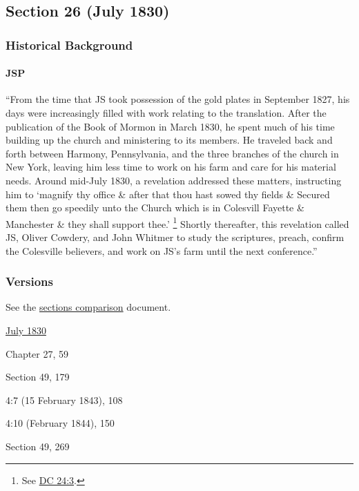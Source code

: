 \subsection{Section 26 (July 1830)}
	\label{DC26}
	
	\subsubsection{Historical Background}
		\label{DC26-HB}
		
		\paragraph{JSP}
		
			``From the time that JS took possession of the gold plates in September 1827, his days were increasingly filled with work relating to the translation. After the publication of the Book of Mormon in March 1830, he spent much of his time building up the church and ministering to its members. He traveled back and forth between Harmony, Pennsylvania, and the three branches of the church in New York, leaving him less time to work on his farm and care for his material needs. Around mid-July 1830, a revelation addressed these matters, instructing him to `magnify thy office \& after that thou hast sowed thy fields \& Secured them then go speedily unto the Church which is in Colesvill Fayette \& Manchester \& they shall support thee.'%
				\footnote{%
					See \hyperref[DC24-3]{DC 24:3}.
					}
			Shortly thereafter, this revelation called JS, Oliver Cowdery, and John Whitmer to study the scriptures, preach, confirm the Colesville believers, and work on JS's farm until the next conference.''
			
	\subsubsection{Versions}
		\label{DC26-V}
		
		See the \href{https://drive.google.com/file/d/1goAvNz8jS4R8slYfMG_db55Ty2z_vmgK/view?usp=sharing}{sections comparison} document.
	
		\begin{compactdesc}
			\item[JSP] \hyperref[EMS-1830-JS-JUL-1830-B]{July 1830}
			\item[BC] Chapter 27, 59
			\item[DC 1835] Section 49, 179
			\item[TS] 4:7 (15 February 1843), 108
			\item[MS] 4:10 (February 1844), 150
			\item[DC 1844] Section 49, 269
		\end{compactdesc}

